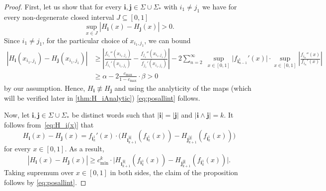 \documentclass[11pt,a4paper]{article}
\def\cref#1{\ref{#1}}%
\theoremstyle{definition}
\theoremstyle{remark}
\newcommand{\0}{\mathbf{0}}
\newcommand{\bi}{\mathbf{i}}
\newcommand{\bj}{\mathbf{j}}
\numberwithin{equation}{section}
\begin{document}
\begin{proof}
First, let us show that for every $\bi,\bj\in\Sigma\cup\Sigma_*$ with $i_1\neq j_1$ we have for
every non-degenerate closed interval $J\subseteq[0,1]$
\begin{equation}\label{eq:posallint}
	\sup_{x\in J} |H_{\bi}(x) - H_{\bj}(x)| > 0.
\end{equation} 
Since $i_{1}\neq j_{1}$, for the particular choice of $x_{i_{1},j_{1}}$, we can bound 
\begin{align*}
	|H_{\bi}(x_{i_{1},j_{1}}) - H_{\bj}(x_{i_{1},j_{1}})| 
	&\geq \left| \frac{f_{i_{1}}''(x_{i_{1},j_{1}})}{f_{i_{1}}'(x_{i_{1},j_{1}})} -
	\frac{f_{j_{1}}''(x_{i_{1},j_{1}})}{f_{j_{1}}'(x_{i_{1},j_{1}})} \right| - 2
	\sum_{n=2}^{\infty}\; \sup_{x\in[0,1]} \big| f_{\bi_{n-1}^{1}}'(x) \big| \cdot \sup_{x\in[0,1]}
	\left| \frac{f_{i_n}''(x)}{f_{i_n}'(x)} \right| \\
	&\geq \alpha -  2\frac{c_{\max}}{1-c_{\max}}\cdot \beta >0
\end{align*}
by our assumption. Hence, $H_{\bi}\not\equiv H_{\bj}$ and using the analyticity of the maps (which
will be verified later in \cref{thm:H_iAnalytic}) \cref{eq:posallint} follows.
	
Now, let $\bi,\bj \in\Sigma\cup\Sigma_*$ be distinct words such that $|\bi|=|\bj|$ and $|\bi\wedge \bj|=k$. It
  follows from~\cref{eq:H_i(x)} that
  \begin{equation*}
    H_{\bi}(x)-H_{\bj}(x) = f_{\bi_k^1}'(x)\cdot \big( H_{\bi_{k+1}^{|\bi|}}(f_{\bi_k^1}(x)) -
    H_{\bj_{k+1}^{|\bj|}}(f_{\bi_k^1}(x)) \big)
\end{equation*}
for every $x\in[0,1]$. As a result,
\begin{equation*}
|H_{\bi}(x)-H_{\bj}(x)| \geq c_{\min}^k\cdot \big| H_{\bi_{k+1}^{|\bi|}}(f_{\bi_k^1}(x)) -
H_{\bj_{k+1}^{|\bj|}}(f_{\bi_k^1}(x)) \big|.
\end{equation*}
Taking supremum over $x\in[0,1]$ in both sides, the claim of the proposition follows by \cref{eq:posallint}.
\end{proof}
\end{document}
